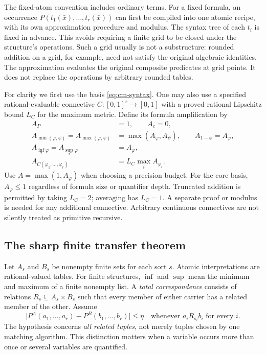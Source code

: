 The fixed-atom convention includes ordinary terms. For a fixed formula,
an occurrence $P(t_1(\bar x),\ldots,t_r(\bar x))$ can first be compiled into
one atomic recipe, with its own approximation procedure and modulus.
The syntax tree of each $t_i$ is fixed in advance. This avoids requiring a
finite grid to be closed under the structure's operations. Such a grid
usually is not a substructure: rounded addition on a grid, for example,
need not satisfy the original algebraic identities.
The approximation evaluates the original composite predicates at grid
points. It does not replace the operations by arbitrary rounded tables.

For clarity we first use the basis \eqref{eq:cm-syntax}.
One may also use a specified rational-evaluable connective
$C:[0,1]^r\to[0,1]$ with a proved rational Lipschitz bound $L_C$ for the
maximum metric. Define its formula amplification by
\begin{equation}
\begin{split}
 A_P&=1,\qquad A_c=0,\\
 A_{\min(\varphi,\psi)}=A_{\max(\varphi,\psi)}
   &=\max(A_\varphi,A_\psi),\qquad A_{1-\varphi}=A_\varphi,\\
 A_{\inf_x\varphi}=A_{\sup_x\varphi}&=A_\varphi,\\
 A_{C(\varphi_1,\ldots,\varphi_r)}
   &=L_C\max_i A_{\varphi_i}.
\end{split}
\label{eq:cm-amplification}
\end{equation}
Use $A=\max(1,A_\varphi)$ when choosing a precision budget.
For the core basis, $A_\varphi\leq1$ regardless of formula size or
quantifier depth. Truncated addition is permitted by taking $L_C=2$;
averaging has $L_C=1$. A separate proof or modulus is needed for any
additional connective. Arbitrary continuous connectives are not silently
treated as primitive recursive.

\subsection{The sharp finite transfer theorem}

Let $A_s$ and $B_s$ be nonempty finite sets for each sort $s$. Atomic
interpretations are rational-valued tables. For finite structures,
$\inf$ and $\sup$ mean the minimum and maximum of a finite nonempty list.
A \emph{total correspondence} consists of relations
$R_s\subseteq A_s\times B_s$ such that every member of either carrier
has a related member of the other. Assume
\begin{equation}
 \bigl|P^A(a_1,\ldots,a_r)-P^B(b_1,\ldots,b_r)\bigr|
 \leq\eta
 \quad\text{whenever }a_iR_{s_i}b_i\text{ for every }i.
 \label{eq:cm-atomic-distortion}
\end{equation}
The hypothesis concerns \emph{all related tuples}, not merely tuples
chosen by one matching algorithm. This distinction matters when a variable
occurs more than once or several variables are quantified.

